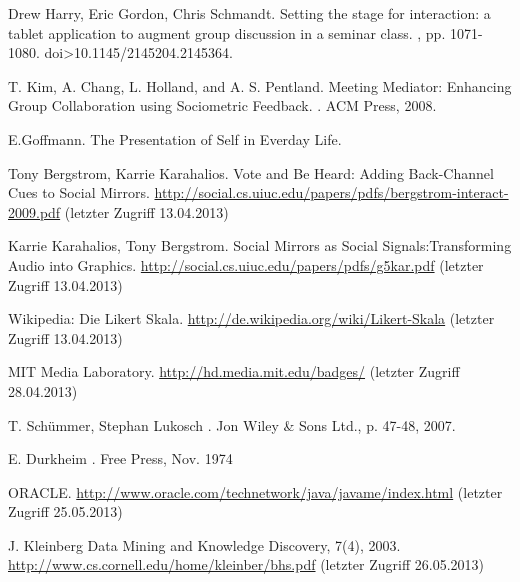 \documentclass{seminarvorlage}
\begin{document}
\begin{thebibliography}{[9]}

Drew Harry, Eric Gordon, Chris Schmandt.
\newblock Setting the stage for interaction: a tablet application to augment group discussion in a seminar class. 
, pp. 1071-1080. doi>10.1145/2145204.2145364. 


T. Kim, A. Chang, L. Holland, and A. S. Pentland.
\newblock Meeting Mediator: Enhancing Group Collaboration using Sociometric Feedback. 
. ACM Press, 2008.

E.Goffmann.
\newblock The Presentation of Self in Everday Life.

Tony Bergstrom, Karrie Karahalios. 
\newblock Vote and Be Heard: Adding Back-Channel Cues to Social Mirrors.
 \url {http://social.cs.uiuc.edu/papers/pdfs/bergstrom-interact-2009.pdf} (letzter Zugriff 13.04.2013)

Karrie Karahalios, Tony Bergstrom. 
\newblock Social Mirrors as Social Signals:Transforming Audio into Graphics.
 \url {http://social.cs.uiuc.edu/papers/pdfs/g5kar.pdf} (letzter Zugriff 13.04.2013)

Wikipedia: Die Likert Skala.
\newblock \url {http://de.wikipedia.org/wiki/Likert-Skala} (letzter Zugriff 13.04.2013)

 MIT Media Laboratory. 
\newblock \url {http://hd.media.mit.edu/badges/} (letzter Zugriff 28.04.2013)

T. Schümmer, Stephan Lukosch
. Jon Wiley \& Sons Ltd., p. 47-48, 2007.

E. Durkheim
. Free Press, Nov. 1974

 ORACLE. 
\newblock \url {http://www.oracle.com/technetwork/java/javame/index.html}
(letzter Zugriff 25.05.2013)

J. Kleinberg Data Mining and Knowledge Discovery, 7(4),
2003.
\newblock \url {http://www.cs.cornell.edu/home/kleinber/bhs.pdf} (letzter Zugriff 26.05.2013)


\end{thebibliography}
\end{document}
